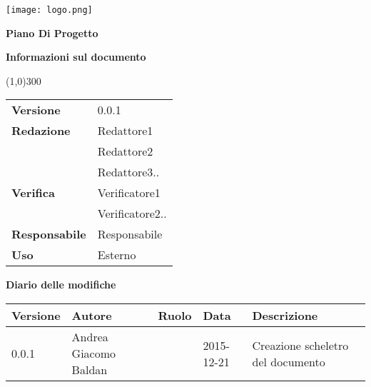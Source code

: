 \documentclass{scalatekids-article}
\begin{document}
\begin{titlepage}
  \centering
  \texttt{[image: logo.png]}\par\vspace{1cm}
  \vspace{1.5cm}
         {\Huge\bfseries Piano Di Progetto \par}
         \begin{center}
           \vspace{1.0cm}
                  {\large\bfseries Informazioni sul documento \par}
         \end{center}
         \vspace{-1cm}
         \begin{center}
           \line(1,0){300}
         \end{center}
         \vspace{0cm}
         \begin{tabular}[c]{l|l}
           \textbf{Versione} & 0.0.1\\
           \textbf{Redazione} & Redattore1\\ & Redattore2\\ & Redattore3..\\
           \textbf{Verifica} & Verificatore1\\ & Verificatore2..\\
           \textbf{Responsabile} & Responsabile\\
           \textbf{Uso} & Esterno
         \end{tabular}
\end{titlepage}
\clearpage
\setcounter{page}{1}
\begin{flushleft}
  \vspace{0cm}
         {\large\bfseries Diario delle modifiche \par}
\end{flushleft}
\vspace{0cm}
\begin{center}
  \begin{tabular}{|l | l | l | l | l |}
    \hline
    Versione & Autore & Ruolo & Data & Descrizione \\
    \hline
    0.0.1 & Andrea Giacomo Baldan & & 2015-12-21 & Creazione scheletro del documento\\
    \hline
  \end{tabular}
\end{center}
\tableofcontents
\newpage
\end{document}
